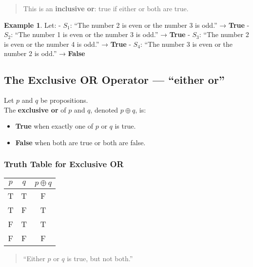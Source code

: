 \documentclass[
]{book}
\providecommand{\tightlist}{%
  \setlength{\itemsep}{0pt}\setlength{\parskip}{0pt}}
\theoremstyle{definition}
\theoremstyle{definition}
\newtheorem{example}{Example}[chapter]
\theoremstyle{definition}
\theoremstyle{definition}
\theoremstyle{remark}
\begin{document}
\begin{quote}
This is an \textbf{inclusive or}: true if either or both are true.
\end{quote}

\begin{example}
\protect\hypertarget{exm:unnamed-chunk-18}{}\label{exm:unnamed-chunk-18}Let:
- \(S_1\): ``The number 2 is even or the number 3 is odd.'' → \textbf{True}
- \(S_2\): ``The number 1 is even or the number 3 is odd.'' → \textbf{True}
- \(S_3\): ``The number 2 is even or the number 4 is odd.'' → \textbf{True}
- \(S_4\): ``The number 3 is even or the number 2 is odd.'' → \textbf{False}
\end{example}

\subsection{The Exclusive OR Operator --- ``either or''}\label{the-exclusive-or-operator-either-or}

Let \(p\) and \(q\) be propositions.\\
The \textbf{exclusive or} of \(p\) and \(q\), denoted \(p \oplus q\), is:

\begin{itemize}
\tightlist
\item
  \textbf{True} when exactly one of \(p\) or \(q\) is true.
\item
  \textbf{False} when both are true or both are false.
\end{itemize}

\subsubsection{Truth Table for Exclusive OR}\label{truth-table-for-exclusive-or}

\begin{longtable}[]{@{}ccc@{}}
\toprule\noalign{}
\(p\) & \(q\) & \(p \oplus q\) \\
\midrule\noalign{}
\endhead
\bottomrule\noalign{}
\endlastfoot
T & T & F \\
T & F & T \\
F & T & T \\
F & F & F \\
\end{longtable}

\begin{quote}
``Either \(p\) or \(q\) is true, but not both.''
\end{quote}
\end{document}
